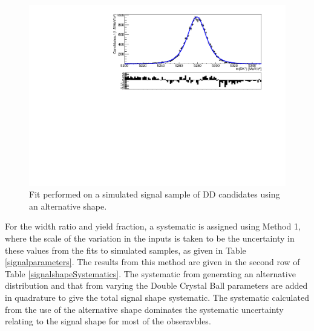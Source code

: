 \begin{figure}[h]
\centering
\includegraphics[width=0.5\linewidth]{figures/fitComponents/signalShape_DD_KPi_Johnson.pdf}
\caption{Fit performed on a simulated signal sample of DD candidates using an alternative shape.}
\label{signalshapesys}
\end{figure}

For the width ratio and yield fraction, a systematic is assigned using Method 1, where the scale of the variation in the inputs is taken to be the uncertainty in these values from the fits to simulated samples, as given in Table \ref{signalparameters}. The results from this method are given in the second row of Table \ref{signalshapeSystematics}. The systematic from generating an alternative distribution and that from varying the Double Crystal Ball parameters are added in quadrature to give the total signal shape systematic. The systematic calculated from the use of the alternative shape dominates the systematic uncertainty relating to the signal shape for most of the \CP obseravbles.

